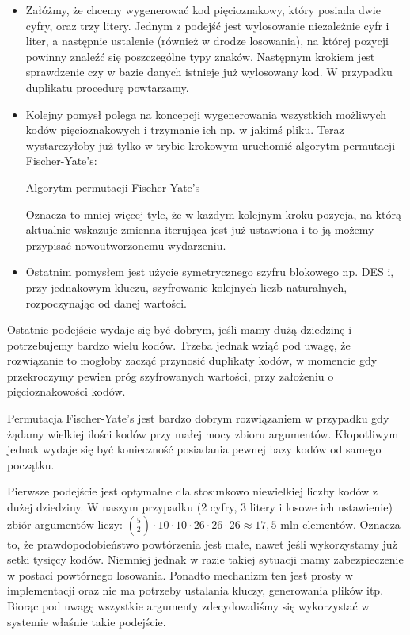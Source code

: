 \documentclass[12pt,titlepage]{article}
\begin{document}
\begin{itemize}
 \item Załóżmy, że chcemy wygenerować kod pięcioznakowy, który posiada dwie cyfry, oraz trzy litery. Jednym z podejść jest wylosowanie niezależnie cyfr i liter, a następnie ustalenie
 (również w drodze losowania), na której pozycji powinny znaleźć się poszczególne typy znaków. Następnym krokiem jest sprawdzenie czy w bazie danych istnieje już wylosowany kod. W przypadku
 duplikatu procedurę powtarzamy.
 
 \item Kolejny pomysł polega na koncepcji wygenerowania wszystkich możliwych kodów pięcioznakowych i trzymanie ich np. w jakimś pliku. Teraz wystarczyłoby już tylko w trybie krokowym
 uruchomić algorytm permutacji Fischer-Yate's:
 
 {\small
\begin{algorithm}[H]
\caption{Algorytm permutacji Fischer-Yate's}\label{alg:fyp}
\end{algorithm}
}

Oznacza to mniej więcej tyle, że w każdym kolejnym kroku pozycja, na którą aktualnie wskazuje zmienna iterująca jest już ustawiona i to ją możemy przypisać nowoutworzonemu wydarzeniu.

\item Ostatnim pomysłem jest użycie symetrycznego szyfru blokowego np. DES i, przy jednakowym kluczu, szyfrowanie kolejnych liczb naturalnych, rozpoczynając od danej wartości.

\end{itemize}

Ostatnie podejście wydaje się być dobrym, jeśli mamy dużą dziedzinę i potrzebujemy bardzo wielu kodów. Trzeba jednak wziąć pod uwagę, że rozwiązanie to mogłoby zacząć przynosić duplikaty
kodów, w momencie gdy przekroczymy pewien próg szyfrowanych wartości, przy założeniu o pięcioznakowości kodów.

Permutacja Fischer-Yate's jest bardzo dobrym rozwiązaniem w przypadku gdy żądamy wielkiej ilości kodów przy małej mocy zbioru argumentów. Kłopotliwym jednak wydaje się być konieczność posiadania
pewnej bazy kodów od samego początku.

Pierwsze podejście jest optymalne dla stosunkowo niewielkiej liczby kodów z dużej dziedziny. W naszym przypadku (2 cyfry, 3 litery i losowe ich ustawienie) zbiór argumentów liczy:
$ \binom{5}{2} \cdot 10 \cdot 10 \cdot 26 \cdot 26 \cdot 26 \approx 17,5$ mln elementów. Oznacza to, że prawdopodobieństwo powtórzenia jest małe, nawet jeśli wykorzystamy już setki tysięcy kodów. Niemniej jednak
w razie takiej sytuacji mamy zabezpieczenie w postaci powtórnego losowania. Ponadto mechanizm ten jest prosty w implementacji oraz nie ma potrzeby ustalania kluczy, generowania plików itp.
Biorąc pod uwagę wszystkie argumenty zdecydowaliśmy się wykorzystać w systemie właśnie takie podejście.
\end{document}
